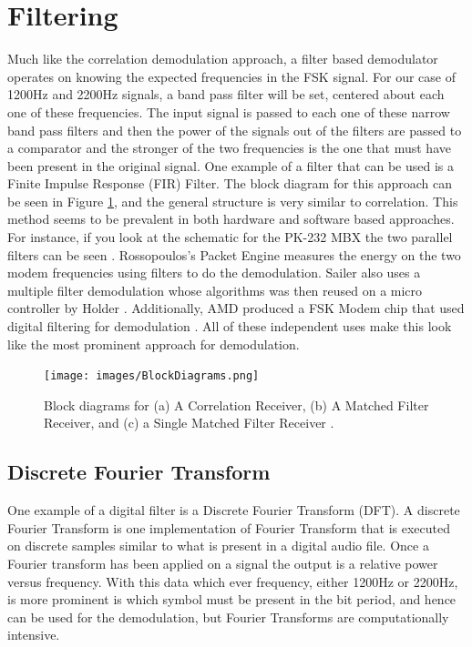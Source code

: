 \section{Filtering}
Much like the correlation demodulation approach, a filter based demodulator operates on knowing the expected frequencies in the FSK signal. For our case of 1200Hz and 2200Hz signals, a band pass filter will be set, centered about each one of these frequencies. The input signal is passed to each one of these narrow band pass filters and then the power of the signals out of the filters are passed to a comparator and the stronger of the two frequencies is the one that must have been present in the original signal. One example of a filter that can be used is a Finite Impulse Response (FIR) Filter. The block diagram for this approach can be seen in Figure \ref{BlockDiagrams}, and the general structure is very similar to correlation. This method seems to be prevalent in both hardware and software based approaches. For instance, if you look at the schematic for the PK-232 MBX the two parallel filters can be seen \cite{Inc.2001}. Rossopoulos's Packet Engine measures the energy on the two modem frequencies using filters to do the demodulation. Sailer also uses a multiple filter demodulation \cite{Sailer1995} whose algorithms was then reused on a micro controller by Holder \cite{Holder2012}. Additionally, AMD produced a FSK Modem chip that used digital filtering for demodulation \cite{Devices1989}. All of these independent uses make this look like the most prominent approach for demodulation. 

\begin{figure}
  \centering
	\texttt{[image: images/BlockDiagrams.png]} 
	\caption{Block diagrams for (a) A Correlation Receiver, (b) A Matched Filter Receiver, and (c) a Single Matched Filter Receiver \cite{J.Das1986}.}
   \label{BlockDiagrams}
\end{figure}

\subsection{Discrete Fourier Transform}
One example of a digital filter is a Discrete Fourier Transform (DFT). A discrete Fourier Transform is one implementation of Fourier Transform that is executed on discrete samples similar to what is present in a digital audio file. Once a Fourier transform has been applied on a signal the output is a relative power versus frequency. With this data which ever frequency, either 1200Hz or 2200Hz, is more prominent is which symbol must be present in the bit period, and hence can be used for the demodulation, but Fourier Transforms are computationally intensive.

